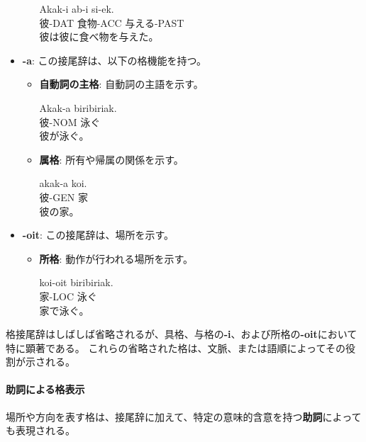 \begin{itemize}
\begin{enumerate}
    \begin{exe}
        \ex \gll Akak-i ab-i si-ek. \\
    彼-DAT 食物-ACC 与える-PAST \\
        \glt 彼は彼に食べ物を与えた。
    \end{exe}
\end{enumerate}

    \item \textbf{-a}: この接尾辞は、以下の格機能を持つ。
    \begin{itemize}
        \item \textbf{自動詞の主格}: 自動詞の主語を示す。
        \begin{exe}
        \ex \gll Akak-a biribiriak.\\
            彼-NOM 泳ぐ\\
        \glt 彼が泳ぐ。
        \end{exe}
        \item \textbf{属格}: 所有や帰属の関係を示す。
        \begin{exe}
        \ex \gll akak-a koi.\\
            彼-GEN 家\\
        \glt 彼の家。
        \end{exe}
    \end{itemize}

    \item \textbf{-oit}: この接尾辞は、場所を示す。
    \begin{itemize}
        \item \textbf{所格}: 動作が行われる場所を示す。
        \begin{exe}
        \ex \gll koi-oit biribiriak.\\
            家-LOC 泳ぐ\\
        \glt 家で泳ぐ。
        \end{exe}
    \end{itemize}
\end{itemize}

格接尾辞はしばしば省略されるが、具格、与格の\textbf{-i}、および所格の\textbf{-oit}において特に顕著である。
これらの省略された格は、文脈、または語順によってその役割が示される。

\paragraph{助詞による格表示}

場所や方向を表す格は、接尾辞に加えて、特定の意味的含意を持つ\textbf{助詞}によっても表現される。

